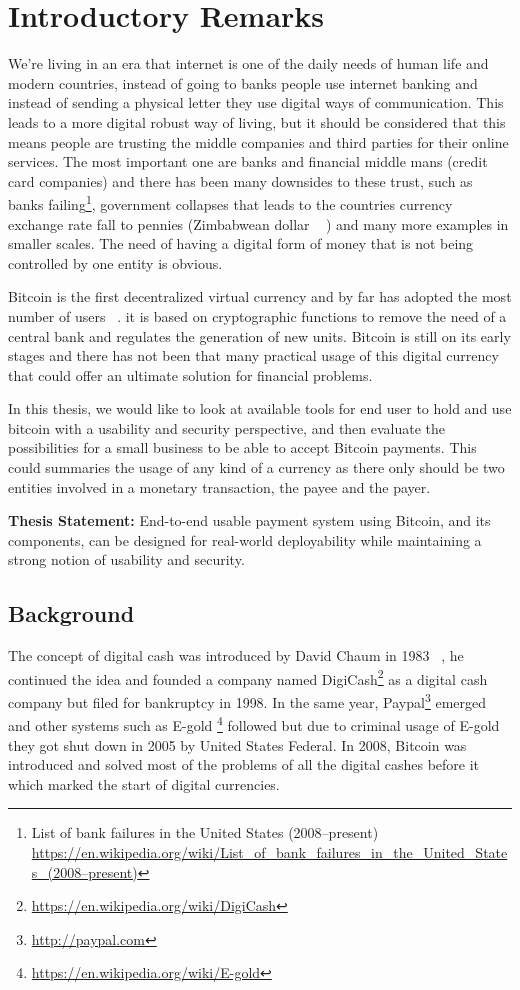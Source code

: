 
\setcounter{page}{1}

\chapter{Introductory Remarks}

We're living in an era that internet is one of the daily needs of human life and modern countries, instead of going to banks people use internet banking and instead of sending a physical letter they use digital ways of communication. This leads to a more digital robust way of living, but it should be considered that this means people are trusting the middle companies and third parties for their online services. The most important one are banks and financial middle mans (\eg credit card companies) and there has been many downsides to these trust, such as banks failing\footnote{List of bank failures in the United States (2008–present) \url{https://en.wikipedia.org/wiki/List_of_bank_failures_in_the_United_States_(2008–present)}}, government collapses that leads to the countries currency exchange rate fall to pennies (\eg Zimbabwean dollar ~\cite{hanke2009measurement} ) and many more examples in smaller scales. The need of having a digital form of money that is not being controlled by one entity is obvious.

Bitcoin is the first decentralized virtual currency and by far has adopted the most number of users ~\cite{Nak08}. it is based on cryptographic functions to remove the need of a central bank and regulates the generation of new units. Bitcoin is still on its early stages and there has not been that many practical usage of this digital currency that could offer an ultimate solution for financial problems.

In this thesis, we would like to look at available tools for end user to hold and use bitcoin with a usability and security perspective, and then evaluate the possibilities for a small business to be able to accept Bitcoin payments. This could summaries the usage of any kind of a currency as there only should be two entities involved in a monetary transaction, the payee and the payer.


\textbf{Thesis Statement:} End-to-end usable payment system using Bitcoin, and its components, can be designed for real-world deployability while maintaining a strong notion of usability and security.

\section{Background}
The concept of digital cash was introduced by David Chaum in 1983 ~\cite{chaum1983blind}, he continued the idea and founded a company named DigiCash\footnote{\url{https://en.wikipedia.org/wiki/DigiCash}} as a digital cash company but filed for bankruptcy in 1998. In the same year, Paypal\footnote{\url{http://paypal.com}} emerged and other systems such as E-gold \footnote{\url{https://en.wikipedia.org/wiki/E-gold}} followed but due to criminal usage of E-gold they got shut down in 2005 by United States Federal. In 2008, Bitcoin was introduced and solved most of the problems of all the digital cashes before it which marked the start of digital currencies.

